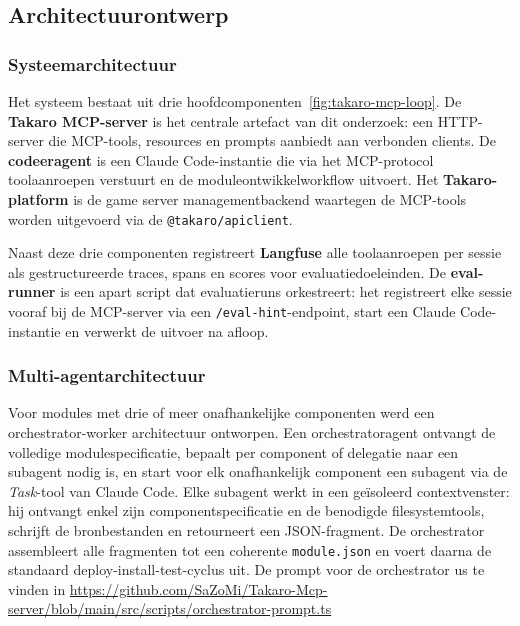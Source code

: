 \subsection{Architectuurontwerp}\label{subsec:architectuur}

\subsubsection{Systeemarchitectuur}

Het systeem bestaat uit drie hoofdcomponenten~\ref{fig:takaro-mcp-loop}. De \textbf{Takaro MCP-server} is het centrale artefact van dit onderzoek: een HTTP-server die MCP-tools, resources en prompts aanbiedt aan verbonden clients. De \textbf{codeeragent} is een Claude Code-instantie die via het MCP-protocol toolaanroepen verstuurt en de moduleontwikkelworkflow uitvoert. Het \textbf{Takaro-platform} is de game server managementbackend waartegen de MCP-tools worden uitgevoerd via de \texttt{@takaro/apiclient}.

Naast deze drie componenten registreert \textbf{Langfuse} alle toolaanroepen per sessie als gestructureerde traces, spans en scores voor evaluatiedoeleinden. De \textbf{eval-runner} is een apart script dat evaluatieruns orkestreert: het registreert elke sessie vooraf bij de MCP-server via een \texttt{/eval-hint}-endpoint, start een Claude Code-instantie en verwerkt de uitvoer na afloop.

\subsubsection{Multi-agentarchitectuur}\label{subsubsec:multiagent-ontwerp}

Voor modules met drie of meer onafhankelijke componenten werd een orchestrator-worker architectuur ontworpen. Een orchestratoragent ontvangt de volledige modulespecificatie, bepaalt per component of delegatie naar een subagent nodig is, en start voor elk onafhankelijk component een subagent via de \textit{Task}-tool van Claude Code. Elke subagent werkt in een geïsoleerd contextvenster: hij ontvangt enkel zijn componentspecificatie en de benodigde filesystemtools, schrijft de bronbestanden en retourneert een JSON-fragment. De orchestrator assembleert alle fragmenten tot een coherente \texttt{module.json} en voert daarna de standaard deploy-install-test-cyclus uit. De prompt voor de orchestrator us te vinden in \url{https://github.com/SaZoMi/Takaro-Mcp-server/blob/main/src/scripts/orchestrator-prompt.ts}

